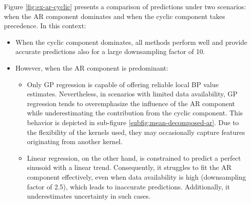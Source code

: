 Figure \ref{fig:ex-ar-cyclic} presents a comparison of predictions under two
scenarios: when the AR component dominates and when the cyclic component takes precedence. In this context:

\begin{itemize}
    \item When the cyclic component dominates, all methods perform well and
    provide accurate predictions also for a large downsampling factor of 10.
    \item However, when the AR component is predominant:

    \begin{itemize}
        \item  Only GP regression is capable of offering reliable local BP value estimates.
        Nevertheless, in scenarios with limited data availability, GP regression tends to overemphasize the influence of
        the AR component while underestimating the contribution from the cyclic component.
        This behavior is depicted in sub-figure \ref{subfig:mean-decomposed-ar}.
        Due to the flexibility of the kernels used, they may occasionally capture features originating from another kernel.
        \item Linear regression, on the other hand, is constrained
        to predict a perfect sinusoid with a linear trend.
        Consequently, it struggles to fit the AR component effectively,
        even when data availability is high (downsampling factor of 2.5), which leads to inaccurate predictions.
        Additionally, it underestimates uncertainty in such cases.
    \end{itemize}
\end{itemize}


